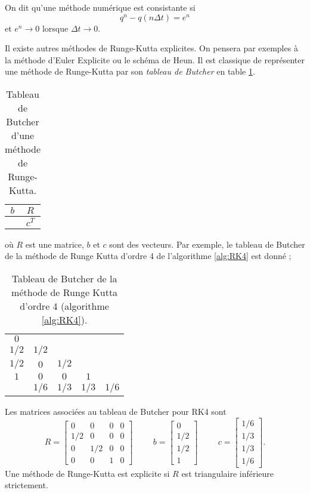 On dit qu'une méthode numérique est consistante \cite{Demailly2016} si
\begin{equation}
q^n - q(n \Delta t) = e^n
\end{equation}
et $e^n \rightarrow 0$ lorsque $\Delta t \rightarrow 0$.

Il existe autres méthodes de Runge-Kutta explicites. On pensera par exemples à la méthode d'Euler Explicite ou le schéma de Heun. Il est classique de représenter une méthode de Runge-Kutta par son \textit{tableau de Butcher} en table \ref{tab:butcher}.

\begin{table}[htbp]
\begin{center}
\begin{tabular}{c|c}
$b$ & $R$ \\
\hline
    & $c^T$
\end{tabular}
\end{center}
\caption{Tableau de Butcher d'une méthode de Runge-Kutta.}
\label{tab:butcher}
\end{table}

où $R$ est une matrice, $b$ et $c$ sont des vecteurs. Par exemple, le tableau de Butcher de la méthode de Runge Kutta d'ordre 4 de l'algorithme \ref{alg:RK4} est donné ;
\begin{table}[htbp]
\begin{center}
\begin{tabular}{c|cccc}
$0$   &       &      &      &      \\
$1/2$ & $1/2$ &      &      &      \\
$1/2$ & $0$   & $1/2$&      &      \\
$1$   & $0$   & $0$  & $1$  &      \\  
\hline
      & $1/6$ & $1/3$& $1/3$& $1/6$\\
\end{tabular}
\end{center}
\caption{Tableau de Butcher de la méthode de Runge Kutta d'ordre 4 (algorithme \ref{alg:RK4}).}
\end{table}
Les matrices associées au tableau de Butcher pour RK4 sont
\begin{equation}
R= \begin{bmatrix}
0 & 0 & 0 & 0 \\
1/2& 0& 0 & 0 \\
0 &1/2& 0 & 0 \\
0 & 0 & 1 & 0
\end{bmatrix}
\hspace{1cm}
b=\begin{bmatrix}
0\\1/2\\1/2\\1
\end{bmatrix}
\hspace{1cm}
c=\begin{bmatrix}
1/6\\1/3\\1/3\\1/6
\end{bmatrix}.
\end{equation}
Une méthode de Runge-Kutta est explicite si $R$ est triangulaire inférieure strictement.




